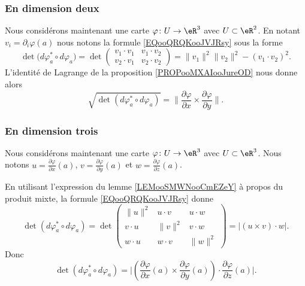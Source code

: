\subsubsection{En dimension deux}

Nous considérons maintenant une carte \( \varphi\colon U\to \eR^3\) avec \( U\subset \eR^2\). En notant \( v_i=\partial_i\varphi(a)\) nous notons la formule \eqref{EQooQRQKooJVJRsy} sous la forme
\begin{equation}
	\det\big( d\varphi_a^*\circ d\varphi_a \big)=
	\det\begin{pmatrix}
		v_1\cdot v_1 & v_1\cdot v_2 \\
		v_2\cdot v_1 & v_2\cdot v_2
	\end{pmatrix}=\| v_1 \|^2\| v_2 \|^2-(v_1\cdot v_2)^2.
\end{equation}
L'identité de Lagrange de la proposition \ref{PROPooMXAIooJureOD} nous donne alors
\begin{equation}
	\sqrt{ \det(d\varphi_a^*\circ d\varphi_a )  }=\| \frac{ \partial \varphi }{ \partial x }\times \frac{ \partial \varphi }{ \partial y } \|.
\end{equation}

\subsubsection{En dimension trois}

Nous considérons maintenant une carte \( \varphi\colon U\to \eR^3\) avec \( U\subset \eR^3\). Nous notons \( u=\frac{ \partial \varphi }{ \partial x }(a)\), \( v=\frac{ \partial \varphi }{ \partial y }(a)\) et \( w=\frac{ \partial \varphi }{ \partial z }(a)\).

En utilisant l'expression du lemme \ref{LEMooSMWNooCmEZeY} à propos du produit mixte, la formule \ref{EQooQRQKooJVJRsy} donne
\begin{equation}
	\det(d\varphi_a^*\circ d\varphi_a)=\det\begin{pmatrix}
		\| u \|^2 & u\cdot v  & u\cdot w  \\
		v\cdot u  & \| v \|^2 & v\cdot w  \\
		w\cdot u  & w\cdot v  & \| w \|^2
	\end{pmatrix}=\big| (u\times v)\cdot w \big|.
\end{equation}
Donc
\begin{equation}        \label{EQooYIJSooHtkXfu}
	\det(d\varphi_a^*\circ d\varphi_a)=\big| (\frac{ \partial \varphi }{ \partial x }(a)\times \frac{ \partial \varphi }{ \partial y }(a))\cdot \frac{ \partial \varphi }{ \partial z }(a) \big|.
\end{equation}




